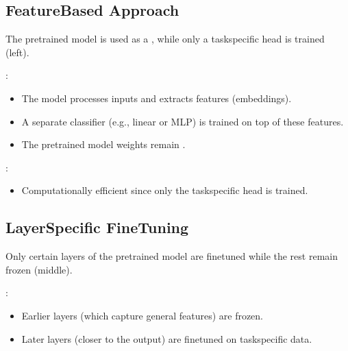 \documentclass[letterpaper,11pt,english]{sphinxmanual}
\begin{document}
\subsection{Feature\sphinxhyphen{}Based Approach}
\label{\detokenize{finetuning:feature-based-approach}}
\sphinxAtStartPar
The pre\sphinxhyphen{}trained model is used as a , while only a task\sphinxhyphen{}specific head is trained {\hyperref[\detokenize{finetuning:fig-fine-tuning}]{}} (left).

\sphinxAtStartPar
{}:
\begin{itemize}
\item {} 
\sphinxAtStartPar
The model processes inputs and extracts features (embeddings).

\item {} 
\sphinxAtStartPar
A separate classifier (e.g., linear or MLP) is trained on top of these features.

\item {} 
\sphinxAtStartPar
The pre\sphinxhyphen{}trained model weights remain .

\end{itemize}

\sphinxAtStartPar
{}:
\begin{itemize}
\item {} 
\sphinxAtStartPar
Computationally efficient since only the task\sphinxhyphen{}specific head is trained.

\end{itemize}


\subsection{Layer\sphinxhyphen{}Specific Fine\sphinxhyphen{}Tuning}
\label{\detokenize{finetuning:layer-specific-fine-tuning}}
\sphinxAtStartPar
Only certain layers of the pre\sphinxhyphen{}trained model are fine\sphinxhyphen{}tuned while the rest remain frozen {\hyperref[\detokenize{finetuning:fig-fine-tuning}]{}} (middle).

\sphinxAtStartPar
{}:
\begin{itemize}
\item {} 
\sphinxAtStartPar
Earlier layers (which capture general features) are frozen.

\item {} 
\sphinxAtStartPar
Later layers (closer to the output) are fine\sphinxhyphen{}tuned on task\sphinxhyphen{}specific data.

\end{itemize}
\end{document}
